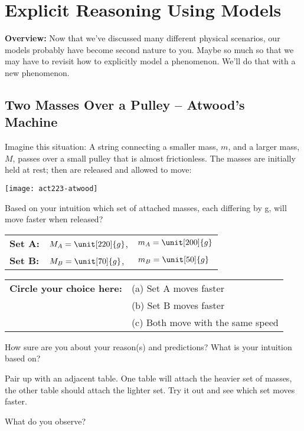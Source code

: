 \section{Explicit Reasoning Using Models}
\label{act2.2.3}

\begin{overview}

	\textbf{Overview:} Now that we've discussed many different physical scenarios, our models probably have become second nature to you. Maybe so much so that we may have to revisit how to explicitly model a phenomenon. We'll do that with a new phenomenon.

\end{overview}

\subsection{Two Masses Over a Pulley -- Atwood's Machine}

\begin{benumerate}
	
	Imagine this situation:  A string connecting a smaller mass, $m$, and a larger mass, $M$, passes over a small pulley that is almost frictionless.  The masses are initially held at rest; then are released and allowed to move:
	
	\begin{center}
		\texttt{[image: act223-atwood]}
	\end{center}
	
	Based on your intuition which set of attached masses, each differing by \unit[20]{g}, will move faster when released?
	
	\begin{center}
	\begin{tabular}{lll}
		\textbf{Set A:}	&	$M_A = \unit[220]{g}$,	&	$m_A = \unit[200]{g}$\\
		\textbf{Set B:}	&	$M_B = \unit[70]{g}$,	&	$m_B = \unit[50]{g}$
	\end{tabular}
	\end{center}
	\begin{center}
		\begin{tabular}{ll}
		\textbf{Circle your choice here:}	&	(a) Set A moves faster\\
								&	(b) Set B moves faster\\
								&	(c) Both move with the same speed
	\end{tabular}
	\end{center}	
	
	
	
	How sure are you about your reason(s) and predictions? What is your intuition based on?
	

	Pair up with an adjacent table.  One table will attach the heavier set of masses, the other table should attach the lighter set. Try it out and see which set moves faster. 
	
	What do you observe?

\WCD
\end{benumerate}

